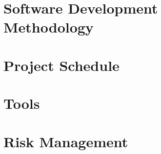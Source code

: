 % 

\section{Software Development Methodology}
\label{software_development_methodology}


\section{Project Schedule}
\label{project_schedule}


\section{Tools}
\label{tools}


\section{Risk Management}
\label{risk_management}

